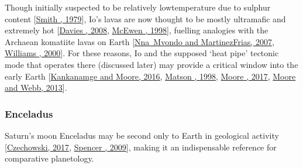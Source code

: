 \documentclass[letterpaper,10pt,english]{jupyterBook}
\begin{document}
\sphinxAtStartPar
Though initially suspected to be relatively low\sphinxhyphen{}temperature due to sulphur content {[}\hyperlink{cite.references:id597}{Smith , 1979}{]}, Io’s lavas are now thought to be mostly ultramafic and extremely hot {[}\hyperlink{cite.references:id598}{Davies , 2008}, \hyperlink{cite.references:id599}{McEwen , 1998}{]}, fuelling analogies with the Archaean komatiite lavas on Earth {[}\hyperlink{cite.references:id602}{Nna Mvondo and Martinez\sphinxhyphen{}Frias, 2007}, \hyperlink{cite.references:id601}{Williams , 2000}{]}. For these reasons, Io \sphinxhyphen{} and the supposed ‘heat pipe’ tectonic mode that operates there (discussed later) \sphinxhyphen{} may provide a critical window into the early Earth {[}\hyperlink{cite.references:id603}{Kankanamge and Moore, 2016}, \hyperlink{cite.references:id600}{Matson , 1998}, \hyperlink{cite.references:id378}{Moore , 2017}, \hyperlink{cite.references:id15}{Moore and Webb, 2013}{]}.


\subsubsection{Enceladus}
\label{\detokenize{content/chapter_01_background/main:enceladus}}
\sphinxAtStartPar
Saturn’s moon Enceladus may be second only to Earth in geological activity {[}\hyperlink{cite.references:id608}{Czechowski, 2017}, \hyperlink{cite.references:id484}{Spencer , 2009}{]}, making it an indispensable reference for comparative planetology.
\end{document}
